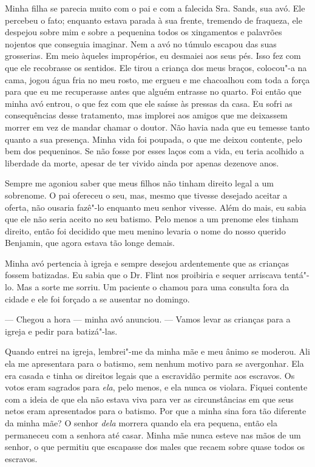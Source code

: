Minha filha se parecia muito com o pai e com a falecida Sra. Sands, sua
avó. Ele percebeu o fato; enquanto estava parada à sua frente, tremendo
de fraqueza, ele despejou sobre mim e sobre a pequenina todos os
xingamentos e palavrões nojentos que conseguia imaginar. Nem a avó no
túmulo escapou das suas grosserias. Em meio àqueles impropérios, eu
desmaiei aos seus pés. Isso fez com que ele recobrasse os sentidos. Ele
tirou a criança dos meus braços, colocou"-a na cama, jogou água fria no
meu rosto, me ergueu e me chacoalhou com toda a força para que eu me
recuperasse antes que alguém entrasse no quarto. Foi então que minha avó
entrou, o que fez com que ele saísse às pressas da casa. Eu sofri as
consequências desse tratamento, mas implorei aos amigos que me deixassem
morrer em vez de mandar chamar o doutor. Não havia nada que eu temesse
tanto quanto a sua presença. Minha vida foi poupada, o que me deixou
contente, pelo bem dos pequeninos. Se não fosse por esses laços com a
vida, eu teria acolhido a liberdade da morte, apesar de ter vivido ainda
por apenas dezenove anos.

Sempre me agoniou saber que meus filhos
não tinham direito legal a um sobrenome. O pai ofereceu o seu, mas,
mesmo que tivesse desejado aceitar a oferta, não ousaria fazê"-lo
enquanto meu senhor vivesse. Além do mais, eu sabia que ele não seria
aceito no seu batismo. Pelo menos a um prenome eles tinham direito,
então foi decidido que meu menino levaria o nome do nosso querido
Benjamin, que agora estava tão longe demais.

Minha avó pertencia à igreja e sempre
desejou ardentemente que as crianças fossem batizadas. Eu sabia que o
Dr. Flint nos proibiria e sequer arriscava tentá"-lo. Mas a sorte me
sorriu. Um paciente o chamou para uma consulta fora da cidade e ele foi
forçado a se ausentar no domingo.

--- Chegou a hora --- minha avó anunciou. --- Vamos levar as crianças
para a igreja e pedir para batizá"-las.

Quando entrei na igreja, lembrei"-me da
minha mãe e meu ânimo se moderou. Ali ela me apresentara para o batismo,
sem nenhum motivo para se avergonhar. Ela era casada e tinha os direitos
legais que a escravidão permite aos escravos. Os votos eram sagrados
para \emph{ela}, pelo menos, e ela nunca os violara. Fiquei contente com
a ideia de que ela não estava viva para ver as circunstâncias em que
seus netos eram apresentados para o batismo. Por que a minha sina fora
tão diferente da minha mãe? O senhor \emph{dela} morrera quando ela era
pequena, então ela permaneceu com a senhora até casar. Minha mãe nunca
esteve nas mãos de um senhor, o que permitiu que escapasse dos males que
recaem sobre quase todos os escravos.


